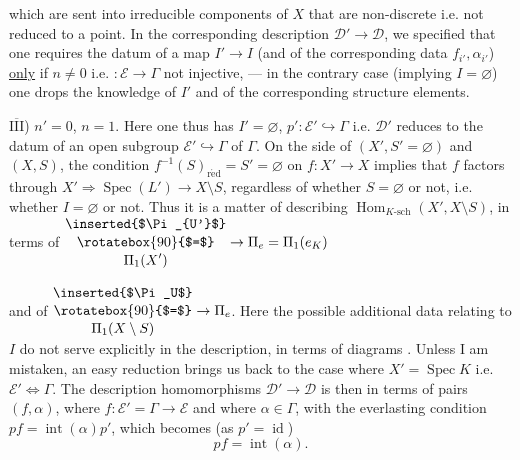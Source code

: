 
which are sent into irreducible components of $X$  that are non-discrete i.e. not reduced to a point.
In the corresponding description $\mathcal D'\to\mathcal D$, we specified that one requires the datum of a map $I'\to I$ (and of the corresponding data $f_{i'},\alpha_{i'}$) \uline{only} if  $n\ne0$ i.e. $:\mathcal E\to\Gamma$ not injective, --- in the contrary case (implying $I=\varnothing$)  one drops the knowledge of $I'$ and of the corresponding structure elements.

\uline{$\overline{\mathrm{III}}$}) $n'=0$, $n=1$. Here one thus has $I'=\varnothing$, $p':\mathcal E'\hookrightarrow\Gamma$ i.e. $\mathcal D'$ reduces to the datum of an open subgroup $\mathcal E'\hookrightarrow\Gamma$ of $\Gamma$.
On the side of $(X',S'=\varnothing)$ and $(X,S)$, the condition $f^{-1}(S)_{\mathrm{r\acute ed}}=S'=\varnothing$ on  $f:X'\to X$ implies that $f$ factors through $X'\Longrightarrow\operatorname{Spec}(L')\longrightarrow X\setminus S$, regardless of whether $S=\varnothing$ or not, i.e. whether $I=\varnothing$ or not. Thus it is a matter of describing $\operatorname{Hom}_{K\text{-sch}}(X',X\setminus S)$, in terms of $\begin{gathered}\text{\inserted{$\Pi_{U'}$}}\\[-2pt]\rotatebox{90}{$=$}\\[-2pt]\Pi_1(X')\end{gathered}\to\Pi_e=\Pi_1(e_K)$



and of $\begin{gathered}\text{\inserted{$\Pi_U$}}\\[-2pt]\rotatebox{90}{$=$}\\[-2pt]\Pi_1(X\setminus S)\end{gathered}\to\Pi_e$.
Here the possible additional data relating to $I$ do not serve explicitly in the description, in terms of diagrams .
Unless I am mistaken, an easy reduction  brings us back to the case where $X'=\operatorname{Spec}K$ i.e. $\mathcal E'\Leftrightarrow\Gamma$. The description  homomorphisms $\mathcal D'\to\mathcal D$ is then  in terms of pairs $(f,\alpha)$, where $f:\mathcal E'=\Gamma\to\mathcal E$ and where $\alpha\in\Gamma$, with the everlasting condition $pf=\operatorname{int}(\alpha)p'$, which becomes (as $p'=\operatorname{id}$)
\[
 pf=\operatorname{int}(\alpha).
\]

